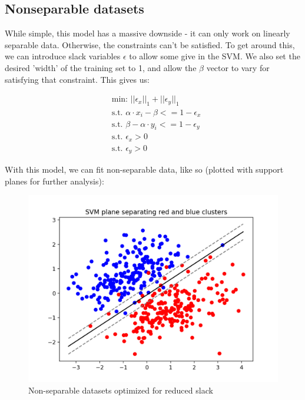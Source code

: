 \documentclass[]{article}
\begin{document}
\subsection{Nonseparable datasets}

While simple, this model has a massive downside - it can only work on linearly separable data. Otherwise, the constraints can't be satisfied. To get around this, we can introduce slack variables $\epsilon$ to  allow some give in the SVM. We also set the desired 'width' of the training set to 1, and allow the $\beta$ vector to vary for satisfying that constraint. This gives us:
	
	\begin{equation}
	\begin{split}
	&\text{min: } ||\epsilon_x||_1 + ||\epsilon_y||_1
	\\
	&\text{s.t. } \alpha \cdot x_i - \beta <= 1 - \epsilon_x
	\\
	&\text{s.t. } \beta - \alpha \cdot y_i  <= 1 - \epsilon_y
	\\
	&\text{s.t. } \epsilon_x > 0
	\\
	&\text{s.t. } \epsilon_y > 0
	\end{split}
	\end{equation}
	
With this model, we can fit non-separable data, like so (plotted with support planes for further analysis):

\begin{figure}[H]
	\includegraphics[width=\linewidth]{thin_lines.png}
	\caption{Non-separable datasets optimized for reduced slack}
\end{figure}
\end{document}
